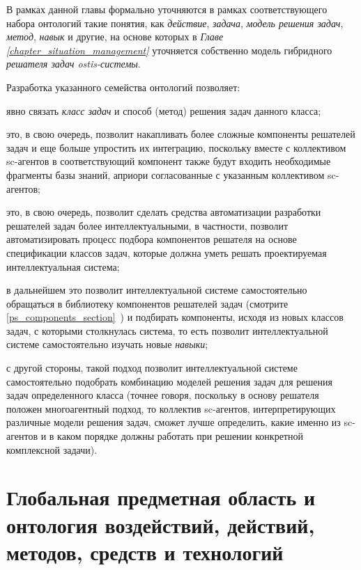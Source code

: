 В рамках данной главы формально уточняются в рамках соответствующего набора онтологий такие понятия, как \textit{действие}, \textit{задача}, \textit{модель решения задач}, \textit{метод}, \textit{навык} и другие, на основе которых в \textit{Главе \ref{chapter_situation_management} } уточняется собственно модель гибридного \textit{решателя задач ostis-системы}.

Разработка указанного семейства онтологий позволяет:
\begin{textitemize}
	\item явно связать \textit{класс задач} и способ (метод) решения задач данного класса;
	\item это, в свою очередь, позволит накапливать более сложные компоненты решателей задач и еще больше упростить их интеграцию, поскольку вместе с коллективом sc-агентов в соответствующий компонент также будут входить необходимые фрагменты базы знаний, априори согласованные с указанным коллективом sc-агентов;
	\item это, в свою очередь, позволит сделать средства автоматизации разработки решателей задач более интеллектуальными, в частности, позволит автоматизировать процесс подбора компонентов решателя на основе спецификации классов задач, которые должна уметь решать проектируемая интеллектуальная система;
	\item в дальнейшем это позволит интеллектуальной системе самостоятельно обращаться в библиотеку компонентов решателей задач (смотрите \ref{ps_components_section}~) и подбирать компоненты, исходя из новых классов задач, с которыми столкнулась система, то есть позволит интеллектуальной системе самостоятельно изучать новые \textit{навыки};
	\item с другой стороны, такой подход позволит интеллектуальной системе самостоятельно подобрать комбинацию моделей решения задач для решения задач определенного класса (точнее говоря, поскольку в основу решателя положен многоагентный подход, то коллектив sc-агентов, интерпретирующих различные модели решения задач, сможет лучше определить, какие именно из sc-агентов и в каком порядке должны работать при решении конкретной комплексной задачи).
\end{textitemize}


\section{Глобальная предметная область и онтология воздействий, действий, методов, средств и технологий}
\label{sec_global_sd_actions}

